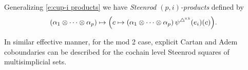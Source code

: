 Generalizing \eqref{e:cup-i products} we have \textit{Steenrod $(p,i)$-products} defined by
\[
(\alpha_1 \otimes \dots \otimes \alpha_p) \mapsto \Big( c \mapsto (\alpha_1 \otimes \dots \otimes \alpha_p) \, \psi^{\triangle^{\!\times\mathit{k}}}(e_{i})(c) \Big).
\]

In similar effective manner, for the mod 2 case, explicit Cartan and Adem coboundaries \cite{medina2020cartan, medina2020adem} can be described for the cochain level Steenrod squares of multisimplicial sets.